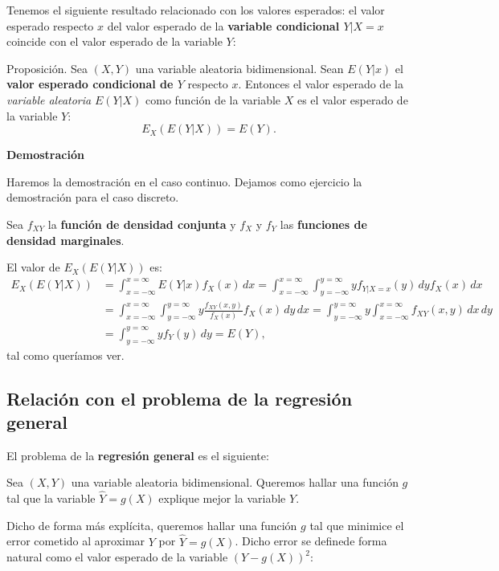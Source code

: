 \documentclass[]{book}
\begin{document}
Tenemos el siguiente resultado relacionado con los valores esperados: el valor esperado respecto \(x\) del valor esperado de la \textbf{variable condicional \(Y|X=x\)} coincide con el valor esperado de la variable \(Y\):

Proposición.
Sea \((X,Y)\) una variable aleatoria bidimensional. Sean \(E(Y|x)\) el \textbf{valor esperado condicional de \(Y\)} respecto \(x\). Entonces el valor esperado de la \emph{variable aleatoria} \(E(Y|X)\) como función de la variable \(X\) es el valor esperado de la variable \(Y\):
\[
E_X(E(Y|X))=E(Y).
\]

\textbf{Demostración}

Haremos la demostración en el caso continuo. Dejamos como ejercicio la demostración para el caso discreto.

Sea \(f_{XY}\) la \textbf{función de densidad conjunta} y \(f_X\) y \(f_Y\) las \textbf{funciones de densidad marginales}.

El valor de \(E_X(E(Y|X))\) es:
\[
\begin{array}{rl}
E_X(E(Y|X)) & =\int_{x=-\infty}^{x=\infty} E(Y|x)f_X(x)\, dx=\int_{x=-\infty}^{x=\infty}\int_{y=-\infty}^{y=\infty} y f_{Y|X=x}(y)\, dy f_X(x)\, dx \\ & = \int_{x=-\infty}^{x=\infty}\int_{y=-\infty}^{y=\infty} y \frac{f_{XY}(x,y)}{f_X(x)}f_X(x)\, dy\, dx = \int_{y=-\infty}^{y=\infty} y \int_{x=-\infty}^{x=\infty}f_{XY}(x,y)\, dx\, dy \\ &  = \int_{y=-\infty}^{y=\infty} y f_Y(y)\, dy = E(Y),
\end{array}
\]
tal como queríamos ver.

\hypertarget{relaciuxf3n-con-el-problema-de-la-regresiuxf3n-general}{%
\subsection{Relación con el problema de la regresión general}\label{relaciuxf3n-con-el-problema-de-la-regresiuxf3n-general}}

El problema de la \textbf{regresión general} es el siguiente:

Sea \((X,Y)\) una variable aleatoria bidimensional. Queremos hallar una función \(g\) tal que la variable \(\hat{Y}=g(X)\) explique mejor la variable \(Y\).

Dicho de forma más explícita, queremos hallar una función \(g\) tal que minimice el error cometido al aproximar \(Y\) por \(\hat{Y}=g(X)\). Dicho error se definede forma natural como el valor esperado de la variable \((Y-g(X))^2\):
\end{document}
